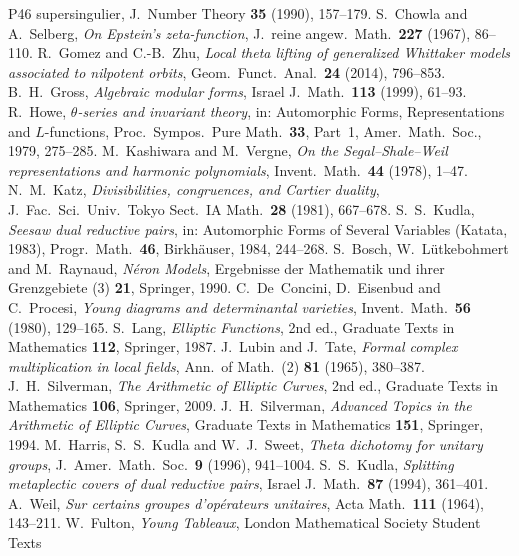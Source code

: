 \documentclass[10pt]{amsart}
\theoremstyle{definition}
\theoremstyle{remark}
\begin{document}
\begin{thebibliography}{P46}
{supersingulier}, J.\ Number Theory \textbf{35} (1990), 157--179.
 S.~Chowla and A.~Selberg, \emph{On Epstein's zeta-function}, J.\ reine
angew.\ Math.\ \textbf{227} (1967), 86--110.
 R.~Gomez and C.-B.~Zhu, \emph{Local theta lifting of generalized Whittaker
models associated to nilpotent orbits}, Geom.\ Funct.\ Anal.\ \textbf{24} (2014), 796--853.
 B.~H.~Gross, \emph{Algebraic modular forms}, Israel J.\ Math.\ \textbf{113}
(1999), 61--93.
 R.~Howe, \emph{$\theta$-series and invariant theory}, in: Automorphic Forms,
Representations and $L$-functions, Proc.\ Sympos.\ Pure Math.\ \textbf{33}, Part~1, Amer.\ Math.\
Soc., 1979, 275--285.
 M.~Kashiwara and M.~Vergne, \emph{On the Segal--Shale--Weil
representations and harmonic polynomials}, Invent.\ Math.\ \textbf{44} (1978), 1--47.
\bibitem{KatzDivisibilities} N.~M.~Katz, \emph{Divisibilities, congruences, and Cartier duality},
J.\ Fac.\ Sci.\ Univ.\ Tokyo Sect.\ IA Math.\ \textbf{28} (1981), 667--678.
\bibitem{KudlaSeesaw} S.~S.~Kudla, \emph{Seesaw dual reductive pairs}, in: Automorphic Forms of
Several Variables (Katata, 1983), Progr.\ Math.\ \textbf{46}, Birkh\"auser, 1984, 244--268.
\bibitem{BLR} S.~Bosch, W.~L\"utkebohmert and M.~Raynaud, \emph{N\'eron Models}, Ergebnisse der
Mathematik und ihrer Grenzgebiete (3) \textbf{21}, Springer, 1990.
\bibitem{DEP} C.~De~Concini, D.~Eisenbud and C.~Procesi, \emph{Young diagrams and determinantal
varieties}, Invent.\ Math.\ \textbf{56} (1980), 129--165.
 S.~Lang, \emph{Elliptic Functions}, 2nd ed., Graduate Texts in Mathematics
\textbf{112}, Springer, 1987.
 J.~Lubin and J.~Tate, \emph{Formal complex multiplication in local fields},
Ann.\ of Math.\ (2) \textbf{81} (1965), 380--387.
 J.~H.~Silverman, \emph{The Arithmetic of Elliptic Curves}, 2nd ed., Graduate
Texts in Mathematics \textbf{106}, Springer, 2009.
 J.~H.~Silverman, \emph{Advanced Topics in the Arithmetic of Elliptic Curves},
Graduate Texts in Mathematics \textbf{151}, Springer, 1994.
 M.~Harris, S.~S.~Kudla and W.~J.~Sweet, \emph{Theta dichotomy for unitary groups},
J.\ Amer.\ Math.\ Soc.\ \textbf{9} (1996), 941--1004.
 S.~S.~Kudla, \emph{Splitting metaplectic covers of dual reductive pairs},
Israel J.\ Math.\ \textbf{87} (1994), 361--401.
 A.~Weil, \emph{Sur certains groupes d'op\'erateurs unitaires}, Acta Math.\
\textbf{111} (1964), 143--211.
\bibitem{FultonYT} W.~Fulton, \emph{Young Tableaux}, London Mathematical Society Student Texts

\end{thebibliography}
\end{document}
